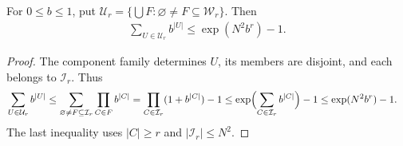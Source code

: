 \begin{lemma}
    \label{thm:cluster_label_window_weights}
    \leanok
    For $0\leq b\leq1$, put
    $\mathcal U_r=\{\bigcup F:\varnothing\ne F\subseteq\mathcal W_r\}$.
    Then
    \begin{align}
        \sum_{U\in\mathcal U_r}b^{|U|}
        \leq\exp(N^2b^r)-1.
        \label{eq:cluster_label_window_weights}
    \end{align}
\end{lemma}
\begin{proof}\leanok
    The component family determines $U$, its members are disjoint,
    and each belongs to $\mathcal I_r$. Thus
    \begin{align}
        \sum_{U\in\mathcal U_r}b^{|U|}
         & \leq\sum_{\varnothing\ne F\subseteq\mathcal I_r}
        \prod_{C\in F}b^{|C|}
        =\prod_{C\in\mathcal I_r}(1+b^{|C|})-1
        \leq\exp\Bigl(\sum_{C\in\mathcal I_r}b^{|C|}\Bigr)-1
        \leq\exp(N^2b^r)-1.
        \label{eq:cluster_label_weight_product}
    \end{align}
    The last inequality uses $|C|\geq r$ and
    $|\mathcal I_r|\leq N^2$.
\end{proof}


